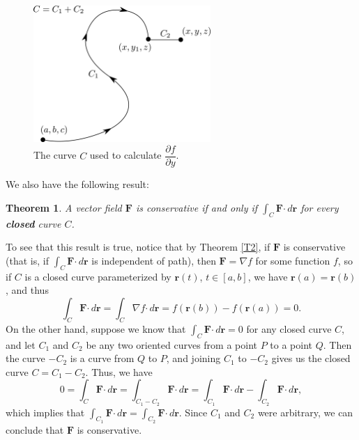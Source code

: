 \documentclass[12pt,letterpaper]{article}
\newtheorem{theorem}{Theorem}
\newcommand{\dotp}{\boldsymbol{\cdot}}
\renewcommand{\r}{\mathbf{r}}
\newcommand{\F}{\mathbf{F}}
\begin{document}
\begin{figure}
\begin{center}
 \includegraphics[width=0.6\textwidth]{conservative}
\end{center}
 \caption{The curve $C$ used to calculate $\dfrac{\partial f}{\partial y}$.}
\end{figure}


We also have the following result:
\begin{theorem}
 A vector field $\F$ is conservative if and only if $\int_C\F\dotp\,d\r$ for every \textbf{closed} curve $C$.
\end{theorem}

To see that this result is true, notice that by Theorem \ref{T2}, if $\F$ is conservative (that is, if $\int_C \F\dotp \,d\r$ is independent of path), then $\F=\nabla f$ for some function $f$, so if $C$ is a closed curve parameterized by $\r(t)$, $t\in [a,b]$, we have $\r(a)=\r(b)$, and thus
\[
 \int_C\F\dotp\,d\r = \int_C\nabla f\dotp \,d\r = f(\r(b))-f(\r(a))=0.
\]
On the other hand, suppose we know that $\int_C\F\dotp\,d\r=0$ for any closed curve $C$, and let $C_1$ and $C_2$ be any two oriented curves from a point $P$ to a point $Q$. Then the curve $-C_2$ is a curve from $Q$ to $P$, and joining $C_1$ to $-C_2$ gives us the closed curve $C=C_1-C_2$. Thus, we have
\[
 0 = \int_C\F\dotp\,d\r = \int_{C_1-C_2} \F\dotp\,d\r = \int_{C_1}\F\dotp\,d\r - \int_{C_2}\F\dotp\,d\r,
\]
which implies that $\int_{C_1}\F\dotp \,d\r = \int_{C_2}\F\dotp\,d\r$. Since $C_1$ and $C_2$ were arbitrary, we can conclude that $\F$ is conservative.
\end{document}
